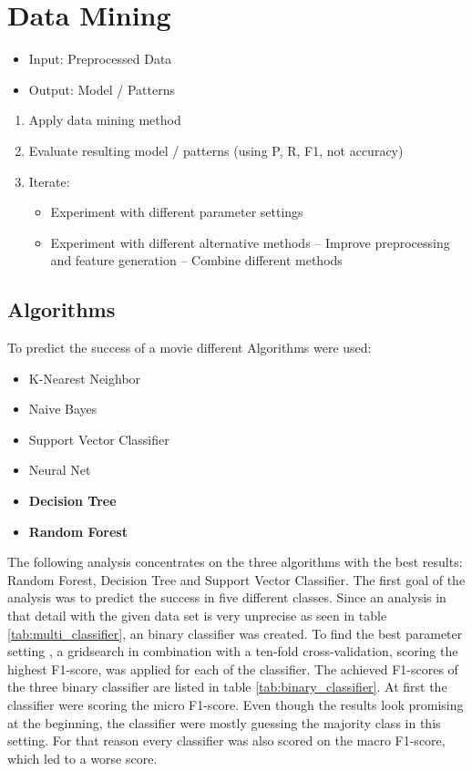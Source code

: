 \chapter{Data Mining}
\label{cha:data_mining}
\begin{itemize}
	\item Input: Preprocessed Data
	\item Output: Model / Patterns
\end{itemize}

\begin{enumerate}
	\item Apply data mining method
	\item Evaluate resulting model / patterns (using P, R, F1, not accuracy)
	\item Iterate:
	\begin{itemize}
		\item Experiment with different parameter settings
		\item Experiment with different alternative methods – Improve preprocessing and feature generation – Combine different methods
	\end{itemize}
\end{enumerate}

\section{Algorithms}
To predict the success of a movie different Algorithms were used:
\begin{itemize}
	\item K-Nearest Neighbor
	\item Naive Bayes
	\item Support Vector Classifier
	\item Neural Net
	\item \textbf{Decision Tree}
	\item \textbf{Random Forest}
\end{itemize}

The following analysis concentrates on the three algorithms with the best results: Random Forest, Decision Tree and Support Vector Classifier.
The first goal of the analysis was to predict the success in five different classes. Since an analysis in that detail with the given data set is very unprecise as seen in table \ref{tab:multi_classifier}, an binary classifier was created. To find the best parameter setting , a gridsearch in combination with a ten-fold cross-validation, scoring the highest F1-score, was applied for each of the classifier.
The achieved F1-scores of the three binary classifier are listed in table \ref{tab:binary_classifier}. At first the classifier were scoring the micro F1-score. Even though the results look promising at the beginning, the classifier were mostly guessing the majority class in this setting. For that reason every classifier was also scored on the macro F1-score, which led to a worse score.

